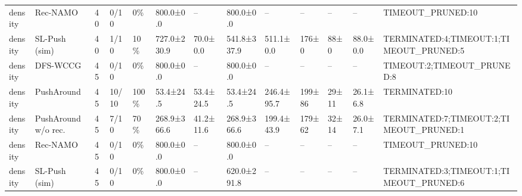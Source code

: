 \begin{tabular}{lllllllllllll}
density & Rec-NAMO & 40 & 0/10 & 0\% & 800.0±0.0 & -- & 800.0±0.0 & -- & -- & -- & -- & TIMEOUT\_PRUNED:10 \\
density & SL-Push (sim) & 40 & 1/10 & 10\% & 727.0±230.9 & 70.0±0.0 & 541.8±337.9 & 511.1±0.0 & 176±0 & 88±0 & 88.0±0.0 & TERMINATED:4;TIMEOUT:1;TIMEOUT\_PRUNED:5 \\
density & DFS-WCCG & 45 & 0/10 & 0\% & 800.0±0.0 & -- & 800.0±0.0 & -- & -- & -- & -- & TIMEOUT:2;TIMEOUT\_PRUNED:8 \\
density & PushAround & 45 & 10/10 & 100\% & 53.4±24.5 & 53.4±24.5 & 53.4±24.5 & 246.4±95.7 & 199±86 & 29±11 & 26.1±6.8 & TERMINATED:10 \\
density & PushAround w/o rec. & 45 & 7/10 & 70\% & 268.9±366.6 & 41.2±11.6 & 268.9±366.6 & 199.4±43.9 & 179±62 & 32±14 & 26.0±7.1 & TERMINATED:7;TIMEOUT:2;TIMEOUT\_PRUNED:1 \\
density & Rec-NAMO & 45 & 0/10 & 0\% & 800.0±0.0 & -- & 800.0±0.0 & -- & -- & -- & -- & TIMEOUT\_PRUNED:10 \\
density & SL-Push (sim) & 45 & 0/10 & 0\% & 800.0±0.0 & -- & 620.0±291.8 & -- & -- & -- & -- & TERMINATED:3;TIMEOUT:1;TIMEOUT\_PRUNED:6 \\
\bottomrule
\end{tabular}

